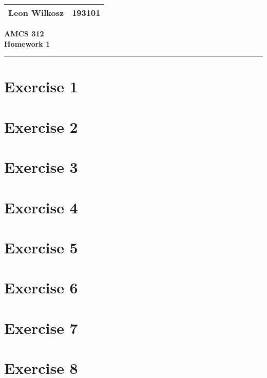 \documentclass[
a4paper,
]{article}
\newcommand{\1}{\mathds{1}}
\begin{document}
	
	\begin{flushright}
		\begin{tabular}{|l|c|}
			\hline
			Leon Wilkosz & 193101 \\ \hline
		\end{tabular}
	\end{flushright}
	\begin{center}
		\Large \textbf{AMCS 312}\\ \medskip
		\large\textbf{Homework 1}\\
	\end{center}
	\medskip
	\hrule
	\vspace{10pt}

        \section*{Exercise 1}
		
		\null\newpage
		
        \section*{Exercise 2}
		
		\null\newpage
		
        \section*{Exercise 3}
		
		\null\newpage
		
        \section*{Exercise 4}
        
        \null\newpage
        
        \section*{Exercise 5}
        
        \null\newpage
        
        \section*{Exercise 6}
	    \null\newpage
        
		\section*{Exercise 7}
        \null\newpage
        
        \section*{Exercise 8}
        \null\newpage
        
\end{document}
